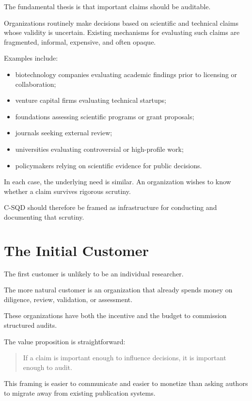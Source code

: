 \documentclass[11pt]{article}
\begin{document}
The fundamental thesis is that important claims should be auditable.

Organizations routinely make decisions based on scientific and technical claims whose validity is uncertain. Existing mechanisms for evaluating such claims are fragmented, informal, expensive, and often opaque.

Examples include:

\begin{itemize}
\item biotechnology companies evaluating academic findings prior to licensing or collaboration;
\item venture capital firms evaluating technical startups;
\item foundations assessing scientific programs or grant proposals;
\item journals seeking external review;
\item universities evaluating controversial or high-profile work;
\item policymakers relying on scientific evidence for public decisions.
\end{itemize}

In each case, the underlying need is similar. An organization wishes to know whether a claim survives rigorous scrutiny.

C-SQD should therefore be framed as infrastructure for conducting and documenting that scrutiny.

\section{The Initial Customer}

The first customer is unlikely to be an individual researcher.

The more natural customer is an organization that already spends money on diligence, review, validation, or assessment.

These organizations have both the incentive and the budget to commission structured audits.

The value proposition is straightforward:

\begin{quote}
If a claim is important enough to influence decisions, it is important enough to audit.
\end{quote}

This framing is easier to communicate and easier to monetize than asking authors to migrate away from existing publication systems.
\end{document}

